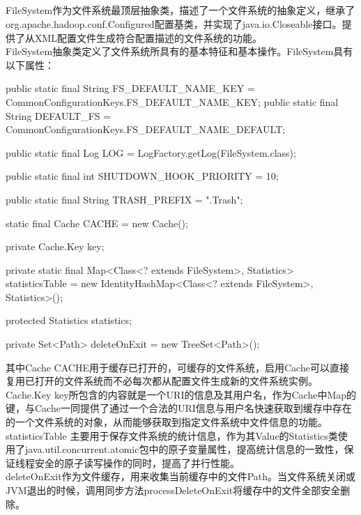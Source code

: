 \subsection{}
    FileSystem作为文件系统最顶层抽象类，描述了一个文件系统的抽象定义，继承了org.apache.hadoop.conf.Configured配置基类，并实现了java.io.Closeable接口。提供了从XML配置文件生成符合配置描述的文件系统的功能。\\
    FileSystem抽象类定义了文件系统所具有的基本特征和基本操作。FileSystem具有以下属性：
    \begin{java}[caption=FileSystem attribute]
public static final String FS_DEFAULT_NAME_KEY = 
    CommonConfigurationKeys.FS_DEFAULT_NAME_KEY;
public static final String DEFAULT_FS = 
    CommonConfigurationKeys.FS_DEFAULT_NAME_DEFAULT;

public static final Log LOG = LogFactory.getLog(FileSystem.class);

public static final int SHUTDOWN_HOOK_PRIORITY = 10;

public static final String TRASH_PREFIX = ".Trash";

static final Cache CACHE = new Cache();

private Cache.Key key;

private static final Map<Class<? extends FileSystem>, Statistics> 
    statisticsTable =
        new IdentityHashMap<Class<? extends FileSystem>, Statistics>();

protected Statistics statistics;

private Set<Path> deleteOnExit = new TreeSet<Path>();

    \end{java}
    其中Cache CACHE用于缓存已打开的，可缓存的文件系统，启用Cache可以直接复用已打开的文件系统而不必每次都从配置文件生成新的文件系统实例。\\
    Cache.Key key所包含的内容就是一个URI的信息及其用户名，作为Cache中Map的键，与Cache一同提供了通过一个合法的URI信息与用户名快速获取到缓存中存在的一个文件系统的对象，从而能够获取到指定文件系统中文件信息的功能。\\
    statisticsTable 主要用于保存文件系统的统计信息，作为其Value的Statistics类使用了java.util.concurrent.atomic包中的原子变量属性，提高统计信息的一致性，保证线程安全的原子读写操作的同时，提高了并行性能。\\
    deleteOnExit作为文件缓存，用来收集当前缓存中的文件Path。当文件系统关闭或JVM退出的时候，调用同步方法processDeleteOnExit将缓存中的文件全部安全删除。\\
    \\
